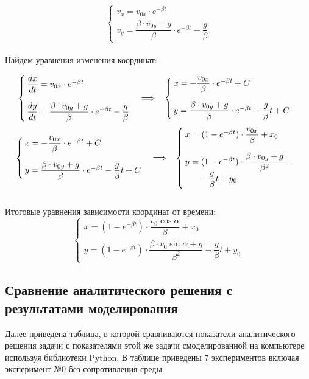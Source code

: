 \[
\begin{cases}
v_x = v_{0x} \cdot e^{-\beta t} \\[14pt]
v_y = \dfrac{\beta \cdot v_{0y} + g}{\beta} \cdot e^{-\beta t} - \dfrac{g}{\beta}
\end{cases}
\]\\
Найдем уравнения изменения координат: 

\[
\begin{cases}
\dfrac{dx}{dt} = v_{0x} \cdot e^{-\beta t} \\[14pt]
\dfrac{dy}{dt} = \dfrac{\beta \cdot v_{0y} + g}{\beta} \cdot e^{-\beta t} - \dfrac{g}{\beta}
\end{cases}
\Longrightarrow \; \; \;
\begin{cases}
x = -\dfrac{v_{0x}}{\beta} \cdot e^{-\beta t} + C\\[14pt]
y = \dfrac{\beta \cdot v_{0y} + g}{\beta} \cdot e^{-\beta t} - \dfrac{g}{\beta}t + C
\end{cases}
\]
\[
\begin{cases}
x = -\dfrac{v_{0x}}{\beta} \cdot e^{-\beta t} + C\\[14pt]
y = \dfrac{\beta \cdot v_{0y} + g}{\beta} \cdot e^{-\beta t} - \dfrac{g}{\beta}t + C
\end{cases}
\Longrightarrow \; \; \;
\begin{cases}
x = (1-e^{-\beta t})\cdot \dfrac{v_{0x}}{\beta} + x_0\\[14pt]
y = (1-e^{-\beta t}) \cdot \dfrac{\beta \cdot v_{0y} + g}{\beta^2} - \\ \; \; \; \; \; \; \; - \dfrac{g}{\beta}t + y_0
\end{cases}
\] \\
Итоговые уравнения зависимости координат от времени:
\[
\begin{cases}
x = (1-e^{-\beta t})\cdot \dfrac{v_0 \cos{\alpha}}{\beta} + x_0\\[14pt]
y = (1-e^{-\beta t}) \cdot \dfrac{\beta \cdot v_0 \sin{\alpha} + g}{\beta^2} - \dfrac{g}{\beta}t + y_0
\end{cases}
\]
\subsection*{Сравнение аналитического решения с результатами моделирования} 
Далее приведена таблица, в которой сравниваются показатели аналитического решения задачи с показателями этой же задачи смоделированной на компьютере используя библиотеки Python. В таблице приведены 7 экспериментов включая эксперимент №0 без сопротивления среды.

